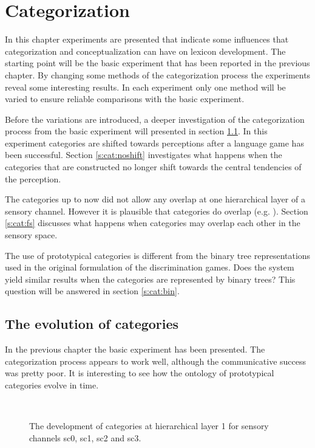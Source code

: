 \chapter{Categorization}\label{ch:cat}

In this chapter experiments are presented that indicate some influences that categorization and conceptualization can have on lexicon development. The starting point will be the basic experiment that has been reported in the previous chapter. By changing some methods of the categorization process the experiments reveal some interesting results. In each experiment only one method will be varied to ensure reliable comparisons with the basic experiment. 

\p
Before the variations are introduced, a deeper investigation of the categorization process from the basic experiment will presented in section \ref{s:cat:evol}. In this experiment categories are shifted towards perceptions after a language game has been successful. Section \ref{s:cat:noshift} investigates what happens when the categories that are constructed no longer shift towards the central tendencies of the perception. 

The categories up to now did not allow any overlap at one hierarchical layer of a sensory channel. However it is plausible that categories do overlap (e.g. \cite{aitchison:1994,lakoff:1987}). Section \ref{s:cat:fs} discusses what happens when categories may overlap each other in the sensory space. 

The use of prototypical categories is different from the binary tree representations used in the original formulation of the discrimination games. Does the system yield similar results when the categories are represented by binary trees? This question will be answered in section \ref{s:cat:bin}.


\section{The evolution of categories}\label{s:cat:evol}

In the previous chapter the basic experiment has been presented. The categorization process appears to work well, although the communicative success was pretty poor. It is interesting to see how the ontology of prototypical categories evolve in time.

\begin{figure}
\centering
{}
\\
\caption{The development of categories at hierarchical layer 1 for sensory channels sc0, sc1, sc2 and sc3.}
\label{f:cat:evol1}
\end{figure}

